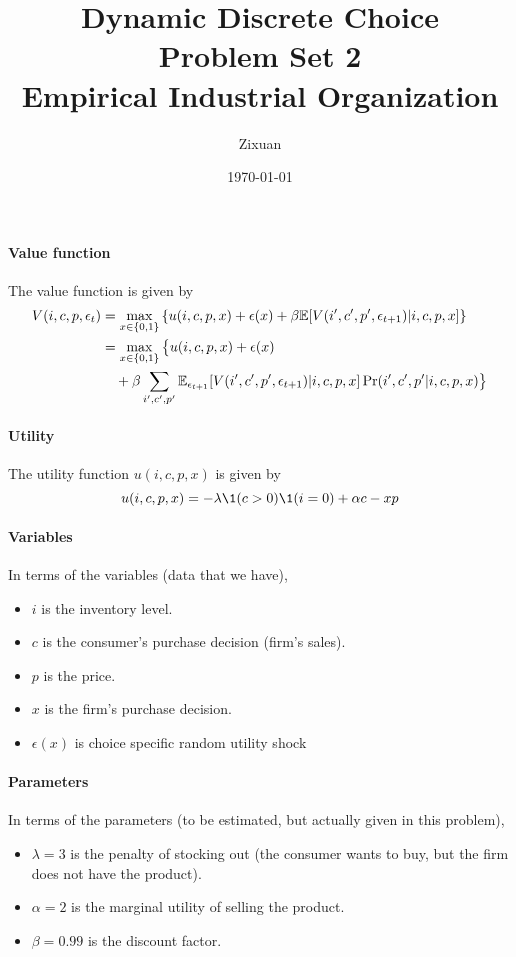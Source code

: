 \documentclass[12pt]{article}[margin=1in]
\title{\textbf{Dynamic Discrete Choice} \\
\vspace{.3cm}
\large Problem Set 2 \\
Empirical Industrial Organization}
\author{Zixuan}
\date{\today}
\begin{document}
\maketitle

\setcounter{page}{1}

\paragraph{Value function} The value function is given by
\begin{equation*}
    \begin{split}
        V(i,c,p,\epsilon_t) & = \max_{x \in \{0,1\}} \left\{ u(i,c,p,x) + \epsilon(x)+ \beta \mathbb{E}[V(i',c',p',\epsilon_{t+1})|i,c,p,x] \right\}     \\
                            & = \max_{x \in \{0,1\}} \big\{ u(i,c,p,x) + \epsilon(x)                                                             \\
                            & \quad + \beta \sum_{i',c',p'}\mathbb{E}_{\epsilon_{t+1}}[V(i',c',p',\epsilon_{t+1})|i,c,p,x] \Pr(i', c',p'|i,c,p,x) \big\}
    \end{split}
\end{equation*}
\paragraph{Utility} The utility function $u(i,c,p,x)$ is given by
\begin{equation*}
    u(i,c,p,x) = -\lambda \1(c>0)\1(i=0) + \alpha c -xp
\end{equation*}
\paragraph{Variables} In terms of the variables (data that we have),
\begin{itemize}
    \item $i$ is the inventory level.
    \item $c$ is the consumer's purchase decision (firm's sales).
    \item $p$ is the price.
    \item $x$ is the firm's purchase decision.
    \item $\epsilon(x)$ is choice specific random utility shock
\end{itemize}
\paragraph{Parameters} In terms of the parameters (to be estimated, but actually given in this
problem),
\begin{itemize}
    \item $\lambda=3$ is the penalty of stocking out (the consumer wants to buy, but the firm does not have the product).
    \item $\alpha=2$ is the marginal utility of selling the product.
    \item $\beta=0.99$ is the discount factor.
\end{itemize}
\end{document}
